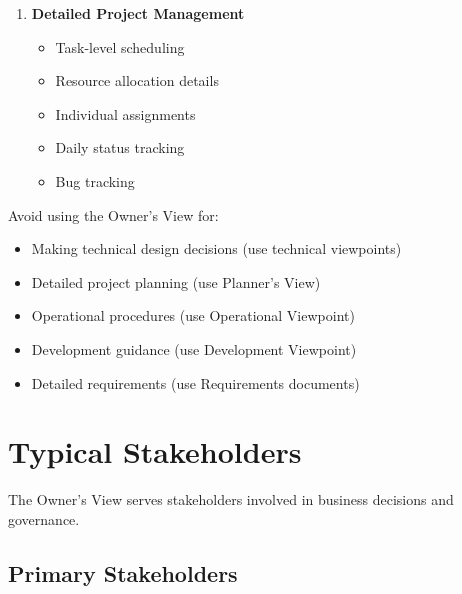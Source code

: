 \documentclass[11pt,letterpaper]{article}
\begin{document}
\begin{enumerate}[label=\textbf{AC\arabic*:}, leftmargin=2.5em]
    \item \textbf{Detailed Project Management}
    \begin{itemize}[nosep]
        \item Task-level scheduling
        \item Resource allocation details
        \item Individual assignments
        \item Daily status tracking
        \item Bug tracking
    \end{itemize}
\end{enumerate}

\begin{warningbox}
Avoid using the Owner's View for:

\begin{itemize}[nosep]
    \item Making technical design decisions (use technical viewpoints)
    \item Detailed project planning (use Planner's View)
    \item Operational procedures (use Operational Viewpoint)
    \item Development guidance (use Development Viewpoint)
    \item Detailed requirements (use Requirements documents)
\end{itemize}
\end{warningbox}

\section{Typical Stakeholders}

The Owner's View serves stakeholders involved in business decisions and governance.

\subsection{Primary Stakeholders}
\end{document}
